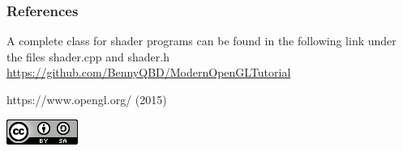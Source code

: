 \documentclass{beamer}
\begin{document}
\begin{frame}
  \frametitle{References}

A complete class for shader programs can be found in the following link under the files shader.cpp and shader.h\\
\url{https://github.com/BennyQBD/ModernOpenGLTutorial}\\

  \footnotesize{
    \begin{thebibliography}{99}

     https://www.opengl.org/ (2015)
    \end{thebibliography}
  }
  \includegraphics[scale=.33]{../cc.png}

\end{frame}
\end{document}
